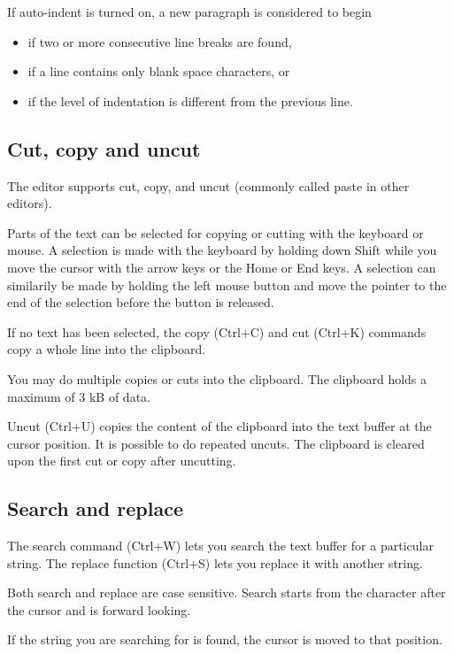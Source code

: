 \documentclass{article}
\begin{document}
        If auto-indent is turned on, a new paragraph is considered to begin

        \begin{itemize}
            \item if two or more consecutive line breaks are found, 
            \item if a line contains only blank space characters, or
            \item if the level of indentation is different from the previous line.
        \end{itemize}

    \subsection{Cut, copy and uncut}
        The editor supports cut, copy, and uncut (commonly called paste in other editors).

        Parts of the text can be selected for copying or cutting with the keyboard or mouse.
        A selection is made with the keyboard by holding down Shift while you move the cursor
        with the arrow keys or the Home or End keys. A selection can similarily be made by
        holding the left mouse button and move the pointer to the end of the selection before
        the button is released.

        If no text has been selected, the copy (Ctrl+C) and cut (Ctrl+K) commands
        copy a whole line into the clipboard.

        You may do multiple copies or cuts into the clipboard. The clipboard holds a maximum of 3 kB of data.

        Uncut (Ctrl+U) copies the content of the clipboard into the text buffer at the cursor position. It is possible
        to do repeated uncuts. The clipboard is cleared upon the first cut or copy after uncutting.

    \subsection{Search and replace}
        The search command (Ctrl+W) lets you search the text buffer for
        a particular string. The replace function (Ctrl+S)
        lets you replace it with another string.

        Both search and replace are case sensitive. Search starts from the character after the cursor
        and is forward looking.

        If the string you are searching for is found, the cursor is moved to that position.
\end{document}
